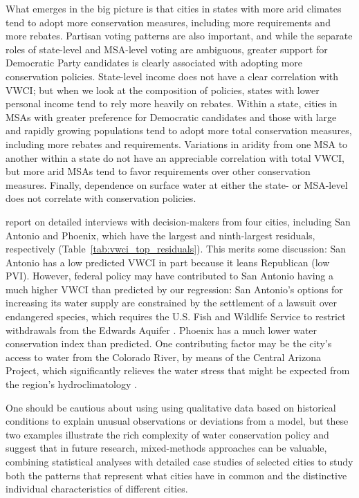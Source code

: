 \documentclass[draft,linenumbers]{agujournal}
\begin{document}
What emerges in the big picture is that cities in states with
more arid climates tend to adopt more
conservation measures, including more requirements and more rebates.
Partisan voting patterns are also important, and while the separate roles
of state-level and MSA-level voting are ambiguous, greater support for
Democratic Party candidates is clearly associated with adopting more conservation policies.
State-level income does not have a clear correlation with VWCI;
but when we look at the composition of policies, states with lower personal
income tend to rely more heavily on rebates.
Within a state, cities in MSAs with greater
preference for Democratic candidates
and those
with large and rapidly growing populations tend to adopt more total conservation
measures, including more rebates and requirements.
Variations in aridity from one MSA to another within a state do not have an appreciable
correlation with total VWCI, but more arid MSAs tend to favor requirements over other
conservation measures.
Finally, dependence on surface water at either the state- or MSA-level
does not correlate with conservation policies.

\citet{brown:politics:2016} report on detailed interviews with decision-makers
from four cities, including San Antonio and Phoenix, which have the largest
and ninth-largest residuals, respectively
(Table~\ref{tab:vwci_top_residuals}).
This merits some discussion:
San Antonio has a low predicted VWCI in part because
it leans Republican (low PVI).
However, federal policy may have
contributed to San Antonio having a much higher VWCI than predicted by our
regression: San Antonio's options for increasing its water supply are
constrained by the settlement of a lawsuit over endangered species, which
requires the U.S. Fish and Wildlife Service to restrict withdrawals from the
Edwards Aquifer \citep{brown:politics:2016}.
Phoenix has a much lower water conservation index than predicted.
One contributing factor may be the city's access to water from the Colorado River,
by means of the Central Arizona Project, which significantly relieves the
water stress that might be expected from the region's hydroclimatology
\citep{brown:politics:2016}.

One should be cautious about using using qualitative data based on historical
conditions to explain unusual observations or deviations from a model,
but these two examples illustrate the rich complexity of water conservation
policy and suggest that in future research, mixed-methods approaches
can be valuable, combining statistical analyses with detailed case studies
of selected cities to study both the patterns that represent what cities
have in common and the distinctive individual characteristics of different cities.
\end{document}
